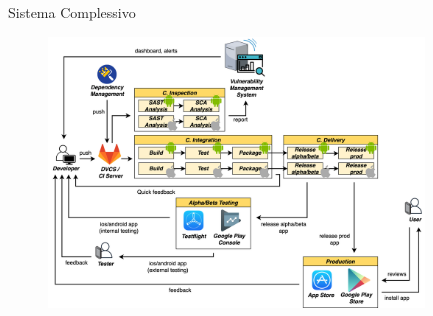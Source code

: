 \begin{frame}{Sistema Complessivo}
    \begin{figure}[H]
        \includegraphics[width=0.89\textwidth]{img/full-cicd.png}
    \end{figure}
\end{frame}